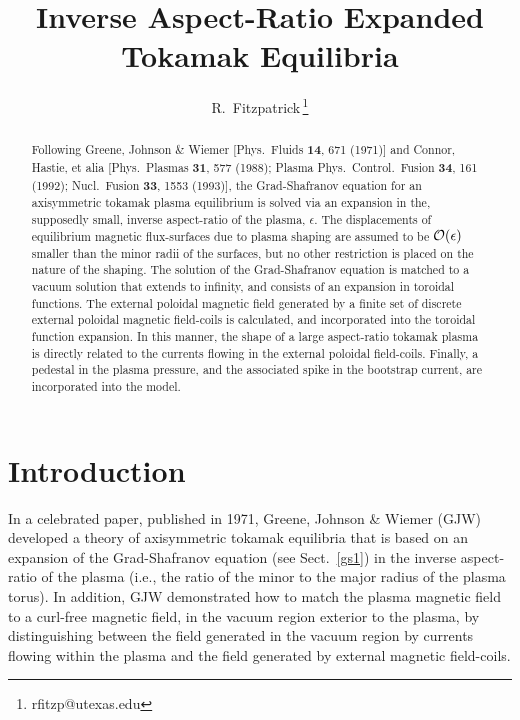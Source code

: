 \documentclass[12pt,prb,aps]{revtex4-1}
\begin{document}
\title{Inverse Aspect-Ratio Expanded Tokamak Equilibria}
\author{R.~Fitzpatrick\,\footnote{rfitzp@utexas.edu}}
\begin{abstract}
Following Greene, Johnson \& Wiemer  [Phys.\  Fluids  {\bf 14}, 671 (1971)] and Connor, Hastie, et alia [Phys.\ Plasmas {\bf 31}, 577 (1988); Plasma Phys.\ Control.\ Fusion {\bf 34}, 161 (1992); Nucl.\ Fusion {\bf 33}, 1553 (1993)],  the
Grad-Shafranov equation for an axisymmetric tokamak plasma equilibrium  is solved via an expansion in the, supposedly small,  inverse aspect-ratio of the plasma, $\epsilon$. 
The displacements of equilibrium magnetic flux-surfaces due to plasma shaping are assumed to be ${\cal O}(\epsilon)$ smaller than the minor radii
of the surfaces, but no other restriction is placed on the nature of the shaping. The solution of the Grad-Shafranov
equation is matched  to a vacuum solution that extends to infinity, and consists of an expansion in toroidal functions. The external poloidal magnetic
field generated by a finite set of discrete external poloidal magnetic field-coils is calculated, and incorporated  into the toroidal function expansion. 
In this manner, the shape of a large aspect-ratio tokamak plasma is directly related to the currents flowing in the external poloidal field-coils. 
Finally, a pedestal in the plasma pressure, and the associated spike in the bootstrap
current, are incorporated into the model.  
\end{abstract}
\maketitle

\section{Introduction}
In a celebrated paper, published in 1971, Greene, Johnson \& Wiemer (GJW) developed a theory of axisymmetric tokamak
equilibria that is based on an expansion of the Grad-Shafranov equation (see Sect.~\ref{gs1}) in the inverse aspect-ratio of the plasma (i.e., the ratio of the minor to the  major radius of the plasma torus).\cite{greene} In addition, GJW demonstrated how to  match the
plasma magnetic field to a curl-free magnetic field, in the vacuum region exterior to the plasma,  by distinguishing between the field generated in the vacuum region by currents flowing within the plasma 
and the field generated by external magnetic field-coils. 
\end{document}
